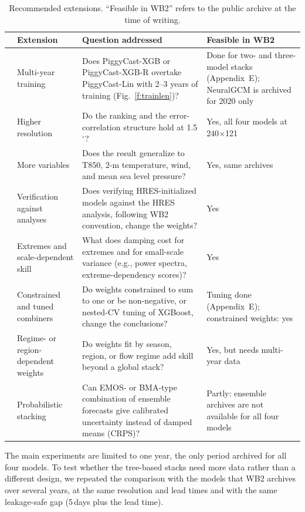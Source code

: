 \documentclass[twocol]{ametsocV6.1}
\newcommand{\PCLin}{PiggyCast-Lin}
\newcommand{\PCXGB}{PiggyCast-XGB}
\newcommand{\PCXGBR}{PiggyCast-XGB-R}
\begin{document}
\begin{table}[t]
\caption{Recommended extensions. ``Feasible in WB2'' refers to the public archive at the time of writing.}\label{t:future}
\begin{center}
\small
\begin{tabular}{>{\raggedright\arraybackslash}p{0.3cm}>{\raggedright\arraybackslash}p{3.0cm}>{\raggedright\arraybackslash}p{5.8cm}>{\raggedright\arraybackslash}p{5.4cm}}
\hline\hline
 & Extension & Question addressed & Feasible in WB2 \\
\hline
1 & Multi-year training & Does \PCXGB{} or \PCXGBR{} overtake \PCLin{} with 2--3 years of training (Fig.~\ref{f:trainlen})? & Done for two- and three-model stacks (Appendix~E); NeuralGCM is archived for 2020 only \\
2 & Higher resolution & Do the ranking and the error-correlation structure hold at 1.5$^\circ$? & Yes, all four models at 240$\times$121 \\
3 & More variables & Does the result generalize to T850, 2-m temperature, wind, and mean sea level pressure? & Yes, same archives \\
4 & Verification against analyses & Does verifying HRES-initialized models against the HRES analysis, following WB2 convention, change the weights? & Yes \\
5 & Extremes and scale-dependent skill & What does damping cost for extremes and for small-scale variance (e.g., power spectra, extreme-dependency scores)? & Yes \\
6 & Constrained and tuned combiners & Do weights constrained to sum to one or be non-negative, or nested-CV tuning of XGBoost, change the conclusions? & Tuning done (Appendix~E); constrained weights: yes \\
7 & Regime- or region-dependent weights & Do weights fit by season, region, or flow regime add skill beyond a global stack? & Yes, but needs multi-year data \\
8 & Probabilistic stacking & Can EMOS- or BMA-type combination of ensemble forecasts give calibrated uncertainty instead of damped means (CRPS)? & Partly: ensemble archives are not available for all four models \\
\hline
\end{tabular}
\end{center}
\end{table}

\appendix[E]

The main experiments are limited to one year, the only period archived for all four models. To test whether the tree-based stacks need more data rather than a different design, we repeated the comparison with the models that WB2 archives over several years, at the same resolution and lead times and with the same leakage-safe gap (5\,days plus the lead time).
\end{document}
